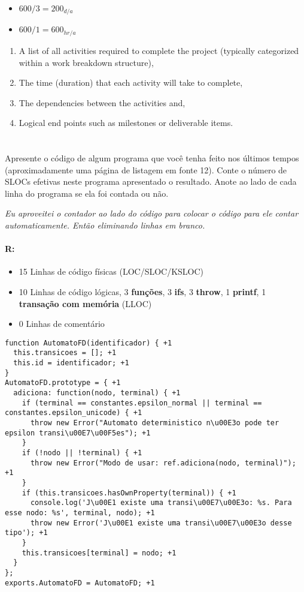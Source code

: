 \documentclass[10pt, a4paper]{report}
\begin{document}
\begin{itemize}
  \item $600 / 3 = 200_{d/a}$
  \item $600 / 1 = 600_{hr/a}$
\end{itemize}

\begin{enumerate}
  \item A list of all activities required to complete the project (typically
categorized within a work breakdown structure),
  \item The time (duration) that each activity will take to complete,
  \item The dependencies between the activities and,
  \item Logical end points such as milestones or deliverable items.
\end{enumerate}

\section{}

\qquad Apresente o código de algum programa que você tenha feito nos últimos
tempos (aproximadamente uma página de listagem em fonte 12). Conte o número de
SLOCs efetivas neste programa apresentado o resultado. Anote ao lado de cada
linha do programa se ela foi contada ou não.

\textit{Eu aproveitei o contador ao lado do código para colocar o código para
ele contar automaticamente. Então eliminando linhas em branco.}

\paragraph{R:}

\begin{itemize}
\item 15 Linhas de código físicas (LOC/SLOC/KSLOC) \item 10 Linhas de código
lógicas, 3 \textbf{funções}, 3 \textbf{ifs}, 3 \textbf{throw}, 1
\textbf{printf}, 1 \textbf{transação com memória} (LLOC) \item 0 Linhas de
comentário
\end{itemize}

\begin{lstlisting}
function AutomatoFD(identificador) { +1
  this.transicoes = []; +1
  this.id = identificador; +1
}
AutomatoFD.prototype = { +1
  adiciona: function(nodo, terminal) { +1
    if (terminal == constantes.epsilon_normal || terminal == constantes.epsilon_unicode) { +1
      throw new Error("Automato deterministico n\u00E3o pode ter epsilon transi\u00E7\u00F5es"); +1
    }
    if (!nodo || !terminal) { +1
      throw new Error("Modo de usar: ref.adiciona(nodo, terminal)"); +1
    }
    if (this.transicoes.hasOwnProperty(terminal)) { +1
      console.log('J\u00E1 existe uma transi\u00E7\u00E3o: %s. Para esse nodo: %s', terminal, nodo); +1
      throw new Error('J\u00E1 existe uma transi\u00E7\u00E3o desse tipo'); +1
    }
    this.transicoes[terminal] = nodo; +1
  }
};
exports.AutomatoFD = AutomatoFD; +1
\end{lstlisting}
\end{document}
